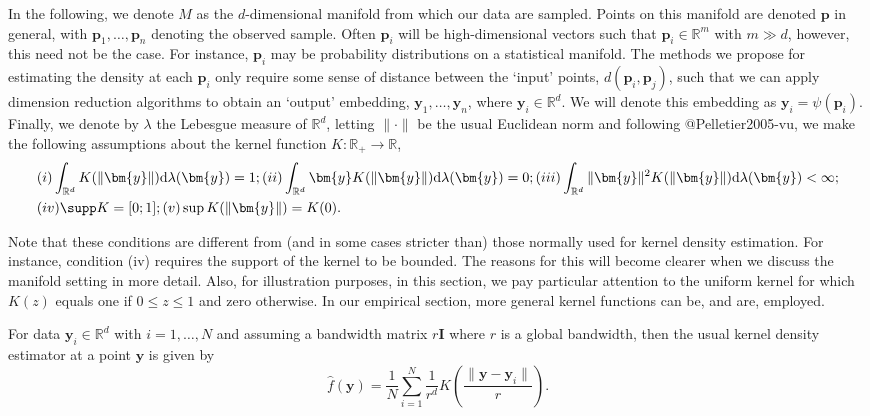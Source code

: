 \documentclass[
]{article}
\begin{document}
In the following, we denote \(M\) as the \(d\)-dimensional manifold from
which our data are sampled. Points on this manifold are denoted
\(\bm{p}\) in general, with \(\bm{p}_1,\dots,\bm{p}_n\) denoting the
observed sample. Often \(\bm{p}_i\) will be high-dimensional vectors
such that \(\bm{p}_i\in\mathbb{R}^m\) with \(m\gg d\), however, this
need not be the case. For instance, \(\bm{p}_i\) may be probability
distributions on a statistical manifold. The methods we propose for
estimating the density at each \(\bm{p}_i\) only require some sense of
distance between the `input' points, \(d(\bm{p}_i,\bm{p}_j)\), such that
we can apply dimension reduction algorithms to obtain an `output'
embedding, \(\bm{y}_1,\dots,\bm{y}_n\), where
\(\bm{y}_i\in\mathbb{R}^d\). We will denote this embedding as
\(\bm{y}_i=\psi(\bm{p}_i)\). Finally, we denote by \(\lambda\) the
Lebesgue measure of \(\mathbb{R}^d\), letting \(\|\cdot\|\) be the usual
Euclidean norm and following @Pelletier2005-vu, we make the following
assumptions about the kernel function
\(K:\mathbb{R}_+\rightarrow\mathbb{R}\), \begin{equation}
\begin{aligned}
\label{eq:kernelcondition}
& (i) \int_{\mathbb{R}^{d}} K(\|\bm{y}\|) \mathrm{d} \lambda(\bm{y})=1;
(ii) \int_{\mathbb{R}^{d}} \bm{y} K(\|\bm{y}\|) \mathrm{d} \lambda(\bm{y})=0;
(iii) \int_{\mathbb{R}^{d}}\|\bm{y}\|^{2} K(\|\bm{y}\|) \mathrm{d} \lambda(\bm{y})<\infty; \\
& (iv) \supp K=[0; 1];
(v) \sup K(\|\bm{y}\|)=K(0).
\end{aligned}
\end{equation}

Note that these conditions are different from (and in some cases
stricter than) those normally used for kernel density estimation. For
instance, condition (iv) requires the support of the kernel to be
bounded. The reasons for this will become clearer when we discuss the
manifold setting in more detail. Also, for illustration purposes, in
this section, we pay particular attention to the uniform kernel for
which \(K(z)\) equals one if \(0\leq z\leq1\) and zero otherwise. In our
empirical section, more general kernel functions can be, and are,
employed.

For data \(\bm{y}_i\in\mathbb{R}^d\) with \(i=1,\dots,N\) and assuming a
bandwidth matrix \(r\bm{I}\) where \(r\) is a global bandwidth, then the
usual kernel density estimator at a point \(\bm{y}\) is given by
\begin{equation}
\label{eq:vkde}
\hat{f}(\bm{y})=\frac{1}{N}\sum\limits_{i=1}^N \frac{1}{r^d} K\left(\frac{\|\bm{y}-\bm{y}_i\|}{r}\right).
\end{equation}
\end{document}
